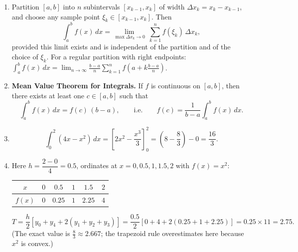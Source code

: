 \documentclass[11pt]{article}
\begin{document}
\begin{corrige}
\begin{enumerate}
\item Partition $[a,b]$ into $n$ subintervals $[x_{k-1}, x_k]$ of width $\Delta x_k = x_k - x_{k-1}$, and choose any sample point $\xi_k \in [x_{k-1}, x_k]$. Then
\[
\int_a^b f(x)\,dx = \lim_{\max \Delta x_k \to 0}\ \sum_{k=1}^n f(\xi_k)\,\Delta x_k,
\]
provided this limit exists and is independent of the partition and of the choice of $\xi_k$. For a regular partition with right endpoints: $\displaystyle\int_a^b f(x)\,dx = \lim_{n\to\infty}\frac{b-a}{n}\sum_{k=1}^n f\!\left(a + k\frac{b-a}{n}\right)$.

\item \textbf{Mean Value Theorem for Integrals.} If $f$ is continuous on $[a,b]$, then there exists at least one $c \in [a,b]$ such that
\[
\int_a^b f(x)\,dx = f(c)\,(b-a), \qquad\text{i.e.}\qquad f(c) = \frac{1}{b-a}\int_a^b f(x)\,dx.
\]

\item 
\[
\int_0^2 (4x - x^2)\,dx = \left[2x^2 - \frac{x^3}{3}\right]_0^2 = \left(8 - \frac{8}{3}\right) - 0 = \frac{16}{3}.
\]

\item Here $h = \dfrac{2-0}{4} = 0.5$, ordinates at $x = 0, 0.5, 1, 1.5, 2$ with $f(x) = x^2$:
\begin{center}
\begin{tabular}{|c|ccccc|}
\hline
\rowcolor{popblueL} $x$ & $0$ & $0.5$ & $1$ & $1.5$ & $2$ \\
\hline
$f(x)$ & $0$ & $0.25$ & $1$ & $2.25$ & $4$ \\
\hline
\end{tabular}
\end{center}
\[
T = \frac{h}{2}\left[y_0 + y_4 + 2(y_1 + y_2 + y_3)\right] = \frac{0.5}{2}\left[0 + 4 + 2(0.25 + 1 + 2.25)\right] = 0.25 \times 11 = 2.75.
\]
(The exact value is $\tfrac{8}{3} \approx 2.667$; the trapezoid rule overestimates here because $x^2$ is convex.)
\end{enumerate}
\end{corrige}
\end{document}
